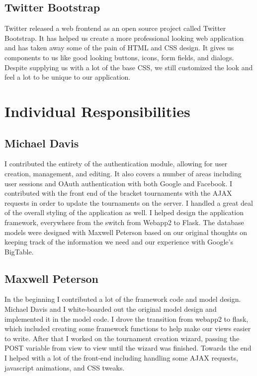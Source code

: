 \documentclass{article}
\begin{document}
\subsection{Twitter Bootstrap}
Twitter released a web frontend as an open source project called Twitter Bootstrap. It has helped us create a more professional looking web application and has taken away some of the pain of HTML and CSS design. It gives us components to us like good looking buttons, icons, form fields, and dialogs. Despite supplying us with a lot of the base CSS, we still customized the look and feel a lot to be unique to our application.



\newpage
\section{Individual Responsibilities}
\subsection{Michael Davis}
I contributed the entirety of the authentication module, allowing for user creation, management, and editing. It also covers a number of areas including user sessions and OAuth authentication with both Google and Facebook. I contributed with the front end of the bracket tournaments with the AJAX requests in order to update the tournaments on the server. I handled a great deal of the overall styling of the application as well. I helped design the application framework, everywhere from the switch from Webapp2 to Flask. The database models were designed with Maxwell Peterson based on our original thoughts on keeping track of the information we need and our experience with Google’s BigTable.

\subsection{Maxwell Peterson}
In the beginning I contributed a lot of the framework code and model design. Michael Davis and I white-boarded out the original model design and implemented it in the model code. I drove the transition from webapp2 to flask, which included creating some framework functions to help make our views easier to write. After that I worked on the tournament creation wizard, passing the POST variable from view to view until the wizard was finished. Towards the end I helped with a lot of the front-end including handling some AJAX requests, javascript animations, and CSS tweaks.
\end{document}
